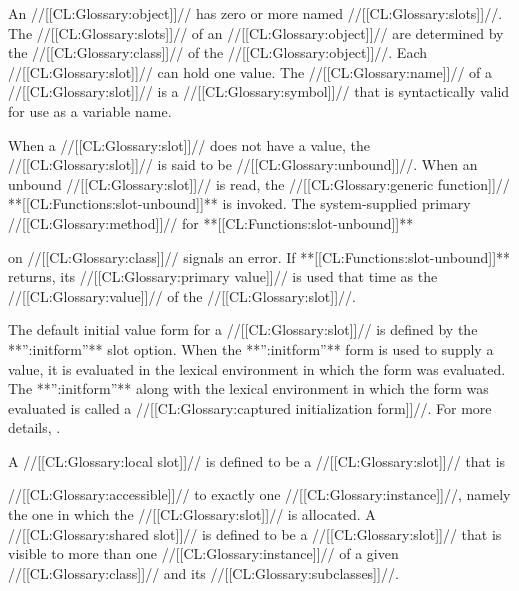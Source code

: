 

                    
An //[[CL:Glossary:object]]//  has zero or more named
//[[CL:Glossary:slots]]//.  The //[[CL:Glossary:slots]]// of an //[[CL:Glossary:object]]// are determined 
by the //[[CL:Glossary:class]]// of the //[[CL:Glossary:object]]//.  Each //[[CL:Glossary:slot]]// can hold
one value.
The //[[CL:Glossary:name]]// of a //[[CL:Glossary:slot]]// is a //[[CL:Glossary:symbol]]// that is syntactically
valid for use as a variable name.

When a //[[CL:Glossary:slot]]// does not have a value, the //[[CL:Glossary:slot]]// is said to be 
//[[CL:Glossary:unbound]]//.  When an unbound //[[CL:Glossary:slot]]// is read,
the //[[CL:Glossary:generic function]]// **[[CL:Functions:slot-unbound]]** is invoked. The 
system-supplied primary //[[CL:Glossary:method]]// 
for **[[CL:Functions:slot-unbound]]** 


on //[[CL:Glossary:class]]//  signals an error.
If **[[CL:Functions:slot-unbound]]** returns, its //[[CL:Glossary:primary value]]// 
is used that time as the //[[CL:Glossary:value]]// of the //[[CL:Glossary:slot]]//.


The default initial value form for a //[[CL:Glossary:slot]]// is defined by
the **'':initform''** slot option.  When the **'':initform''** form is used to
supply a value, it is evaluated in the lexical environment in which
the  form was evaluated. The **'':initform''** along with
the lexical environment in which the  form was evaluated
is called a //[[CL:Glossary:captured initialization form]]//. 
For more details, \seesection\ObjectCreationAndInit.
             
A //[[CL:Glossary:local slot]]// is defined to be a //[[CL:Glossary:slot]]// that is




//[[CL:Glossary:accessible]]//
to exactly one //[[CL:Glossary:instance]]//, 
namely the one in which the //[[CL:Glossary:slot]]// is allocated.  
A //[[CL:Glossary:shared slot]]// is defined to be a //[[CL:Glossary:slot]]// that is visible to more than one
//[[CL:Glossary:instance]]// of a given //[[CL:Glossary:class]]// and its //[[CL:Glossary:subclasses]]//.

